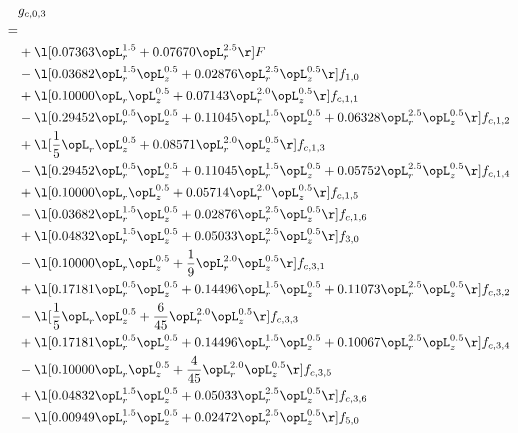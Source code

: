 \begin{alignat}{2} 
\label{eq:g_03_0} 
& g_{c,0,3} \nonumber \\ 
 = \\ 
& + \l[  0.07363 \opL_r^{1.5} +  0.07670 \opL_r^{2.5}  \r] F \nonumber \\ 
& - \l[  0.03682 \opL_r^{1.5} \opL_z^{0.5} +  0.02876 \opL_r^{2.5} \opL_z^{0.5}  \r] f_{1,0} \nonumber \\ 
& + \l[  0.10000 \opL_r \opL_z^{0.5} +  0.07143 \opL_r^{2.0} \opL_z^{0.5}  \r] f_{c,1,1} \nonumber \\ 
& - \l[  0.29452 \opL_r^{0.5} \opL_z^{0.5} +  0.11045 \opL_r^{1.5} \opL_z^{0.5} +  0.06328 \opL_r^{2.5} \opL_z^{0.5}  \r] f_{c,1,2} \nonumber \\ 
& + \l[ \frac{1}{5} \opL_r \opL_z^{0.5} +  0.08571 \opL_r^{2.0} \opL_z^{0.5}  \r] f_{c,1,3} \nonumber \\ 
& - \l[  0.29452 \opL_r^{0.5} \opL_z^{0.5} +  0.11045 \opL_r^{1.5} \opL_z^{0.5} +  0.05752 \opL_r^{2.5} \opL_z^{0.5}  \r] f_{c,1,4} \nonumber \\ 
& + \l[  0.10000 \opL_r \opL_z^{0.5} +  0.05714 \opL_r^{2.0} \opL_z^{0.5}  \r] f_{c,1,5} \nonumber \\ 
& - \l[  0.03682 \opL_r^{1.5} \opL_z^{0.5} +  0.02876 \opL_r^{2.5} \opL_z^{0.5}  \r] f_{c,1,6} \nonumber \\ 
& + \l[  0.04832 \opL_r^{1.5} \opL_z^{0.5} +  0.05033 \opL_r^{2.5} \opL_z^{0.5}  \r] f_{3,0} \nonumber \\ 
& - \l[  0.10000 \opL_r \opL_z^{0.5} + \frac{1}{9} \opL_r^{2.0} \opL_z^{0.5}  \r] f_{c,3,1} \nonumber \\ 
& + \l[  0.17181 \opL_r^{0.5} \opL_z^{0.5} +  0.14496 \opL_r^{1.5} \opL_z^{0.5} +  0.11073 \opL_r^{2.5} \opL_z^{0.5}  \r] f_{c,3,2} \nonumber \\ 
& - \l[ \frac{1}{5} \opL_r \opL_z^{0.5} + \frac{6}{45} \opL_r^{2.0} \opL_z^{0.5}  \r] f_{c,3,3} \nonumber \\ 
& + \l[  0.17181 \opL_r^{0.5} \opL_z^{0.5} +  0.14496 \opL_r^{1.5} \opL_z^{0.5} +  0.10067 \opL_r^{2.5} \opL_z^{0.5}  \r] f_{c,3,4} \nonumber \\ 
& - \l[  0.10000 \opL_r \opL_z^{0.5} + \frac{4}{45} \opL_r^{2.0} \opL_z^{0.5}  \r] f_{c,3,5} \nonumber \\ 
& + \l[  0.04832 \opL_r^{1.5} \opL_z^{0.5} +  0.05033 \opL_r^{2.5} \opL_z^{0.5}  \r] f_{c,3,6} \nonumber \\ 
& - \l[  0.00949 \opL_r^{1.5} \opL_z^{0.5} +  0.02472 \opL_r^{2.5} \opL_z^{0.5}  \r] f_{5,0} \nonumber \\ 

\end{alignat}
